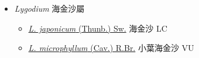 
  \begin{itemize}
 \item[] \textit{Lygodium} 海金沙屬
                    
  \begin{itemize}
        \item[] \href{http://www.theplantlist.org/tpl1.1/search?q=Lygodium+japonicum}{\textit{L. japonicum} (Thunb.) Sw.}   海金沙 LC
        \item[] \href{http://www.theplantlist.org/tpl1.1/search?q=Lygodium+microphyllum}{\textit{L. microphyllum} (Cav.) R.Br.}   小葉海金沙 VU
  \end{itemize}
  \end{itemize}
